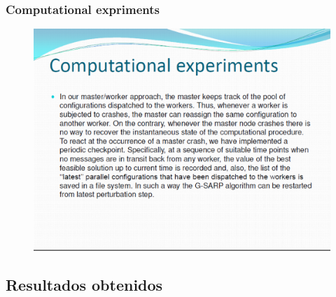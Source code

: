 \documentclass{beamer}
\begin{document}
\begin{frame}
\frametitle{Computational expriments }
\begin{figure}[!th]
\begin{center}
\includegraphics[width=1\textwidth]{img/pic11.eps}
\end{center}
\end{figure}
\end{frame}

\subsection{Resultados obtenidos}
\end{document}
